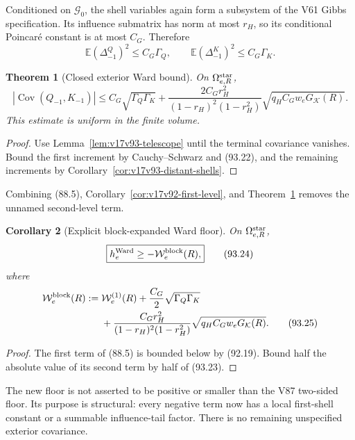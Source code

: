 \documentclass[11pt]{article}
\newtheorem{theorem}{Theorem}[section]
\newtheorem{corollary}[theorem]{Corollary}
\theoremstyle{remark}
\begin{document}
Conditioned on \(\mathscr G_0\), the shell variables again form a
subsystem of the V61 Gibbs specification.  Its influence submatrix has
norm at most \(r_H\), so its conditional Poincar\'e constant is at most
\(C_G\).  Therefore
\[
 \mathbb E(\Delta_{-1}^Q)^2\leq C_G\Gamma_Q,
 \qquad
 \mathbb E(\Delta_{-1}^K)^2\leq C_G\Gamma_K.        \tag{93.22}
\]

\begin{theorem}[Closed exterior Ward bound]
\label{thm:v17v93-exterior}
On \(\Omega_{e,R}^{\rm star}\),
\[
\boxed{
 |\operatorname{Cov}(Q_{-1},K_{-1})|
 \leq C_G\sqrt{\Gamma_Q\Gamma_K}
 +\frac{2C_Gr_H^2}{(1-r_H)^2(1-r_H^2)}
  \sqrt{q_HC_Gw_eG_{\mathcal K}(R)}.}               \tag{93.23}
\]
This estimate is uniform in the finite volume.
\end{theorem}

\begin{proof}
Use Lemma~\ref{lem:v17v93-telescope} until the terminal covariance
vanishes.  Bound the first increment by Cauchy--Schwarz and (93.22),
and the remaining increments by
Corollary~\ref{cor:v17v93-distant-shells}.
\end{proof}

Combining (88.5), Corollary~\ref{cor:v17v92-first-level}, and
Theorem~\ref{thm:v17v93-exterior} removes the unnamed second-level
term.

\begin{corollary}[Explicit block-expanded Ward floor]
\label{cor:v17v93-ward-floor}
On \(\Omega_{e,R}^{\rm star}\),
\[
\boxed{
 h_e^{\rm Ward}\geq-\mathcal W_e^{\rm block}(R),}   \tag{93.24}
\]
where
\[
\begin{aligned}
 \mathcal W_e^{\rm block}(R):={}&
 \mathcal W_e^{(1)}(R)
 +\frac{C_G}{2}\sqrt{\Gamma_Q\Gamma_K}\\
 &+\frac{C_Gr_H^2}{(1-r_H)^2(1-r_H^2)}
  \sqrt{q_HC_Gw_eG_{\mathcal K}(R)}.                \tag{93.25}
\end{aligned}
\]
\end{corollary}

\begin{proof}
The first term of (88.5) is bounded below by (92.19).  Bound half the
absolute value of its second term by half of (93.23).
\end{proof}

The new floor is not asserted to be positive or smaller than the V87
two-sided floor.  Its purpose is structural: every negative term now
has a local first-shell constant or a summable influence-tail factor.
There is no remaining unspecified exterior covariance.
\end{document}
